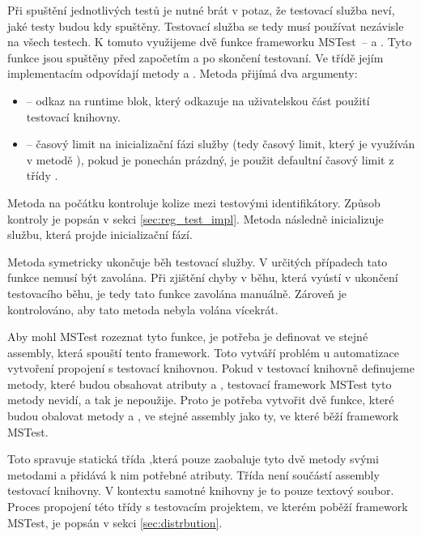 Při spuštění jednotlivých testů je nutné brát v potaz, že testovací služba neví, jaké testy budou kdy spuštěny. Testovací služba se tedy musí používat nezávisle na všech testech. K tomuto využijeme dvě funkce frameworku MSTest~--  a . Tyto funkce jsou spuštěny před započetím a po skončení testovaní. Ve třídě  jejím implementacím odpovídají metody  a . Metoda  přijímá dva argumenty:

\begin{itemize}
    \item {} -- odkaz na runtime blok, který odkazuje na uživatelskou část použití testovací knihovny.
    \item {} -- časový limit na inicializační fázi služby (tedy časový limit, který je využíván v metodě ), pokud je ponechán prázdný, je použit defaultní časový limit z třídy .
\end{itemize}

Metoda  na počátku kontroluje kolize mezi testovými identifikátory. Způsob kontroly je popsán v sekci \ref{sec:reg_test_impl}. Metoda následně inicializuje službu, která projde inicializační fází. 

Metoda  symetricky ukončuje běh testovací služby. V určitých případech tato funkce nemusí být zavolána. Při zjištění chyby v běhu, která vyústí v ukončení testovacího běhu, je tedy tato funkce zavolána manuálně. Zároveň je kontrolováno, aby tato metoda nebyla volána vícekrát.

Aby mohl MSTest rozeznat tyto funkce, je potřeba je definovat ve stejné assembly, která spouští tento framework. Toto vytváří problém u automatizace vytvoření propojení s testovací knihovnou. Pokud v testovací knihovně definujeme metody, které budou obsahovat atributy  a , testovací framework  MSTest tyto metody nevidí, a tak je nepoužije. Proto je potřeba vytvořit dvě funkce, které budou obalovat metody  a , ve stejné assembly jako ty, ve které běží framework MSTest.

Toto spravuje statická třída ,která pouze zaobaluje tyto dvě metody svými metodami a přidává k nim potřebné atributy. Třída není součástí assembly testovací knihovny. V kontextu samotné knihovny je to pouze textový soubor. Proces propojení této třídy s testovacím projektem, ve kterém poběží framework MSTest, je popsán v sekci \ref{sec:distrbution}.

